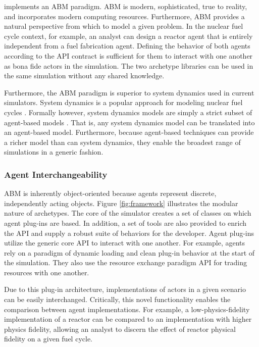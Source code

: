 \Cyclus implements an \acrlong{ABM} paradigm.  \gls{ABM} is modern, sophisticated,
true to reality, and incorporates modern computing resources.
Furthermore, \gls{ABM} provides a natural
perspective from which to model a given problem. In the nuclear fuel cycle
context, for example, an analyst can design a reactor agent
that is entirely independent from a fuel fabrication agent. Defining the behavior of both agents according to the
\gls{API} contract is sufficient for them to interact with one another as
bona fide actors in the simulation.  The two archetype libraries can be used in the same
simulation without any shared knowledge.

Furthermore, the \gls{ABM} paradigm is superior to system dynamics used in
current simulators.
System dynamics is a popular approach for modeling nuclear fuel cycles
\cite{jacobson_vision_2009,van_den_durpel_daness_2009,guerin_impact_2009,guerin_benchmark_2009}.
Formally however, system dynamics models are simply a strict subset of agent-based models
\cite{macal_agent-based_2010}.
That is, any system dynamics model can be translated
into an agent-based model. Furthermore, because agent-based
techniques can provide a richer model than can system dynamics, they enable the
broadest range of simulations in a generic fashion.

\subsubsection{Agent Interchangeability}\label{sec:interchangeability}



\gls{ABM} is inherently object-oriented because agents represent
discrete, independently acting objects.  Figure \ref{fig:framework} illustrates
the modular nature of \Cyclus archetypes.  The core of the \Cyclus simulator
creates a set of classes on which agent plug-ins
are based. In addition, a set of tools are also provided to enrich the
\gls{API} and supply a robust suite of behaviors for the developer.
Agent plug-ins utilize the generic core \gls{API} to interact with one another.  For
example, agents rely on a paradigm of dynamic loading and clean plug-in
behavior at the start of the simulation. They also use the resource exchange
paradigm \gls{API} for trading resources with one another.

Due to this plug-in architecture,
implementations of actors in a given scenario can be easily
interchanged. Critically, this novel functionality enables the comparison
between agent implementations. For example, a low-physics-fidelity
implementation of a reactor can be compared to an implementation with higher
physics fidelity, allowing an analyst to discern the effect of reactor physical
fidelity on a given fuel cycle.

